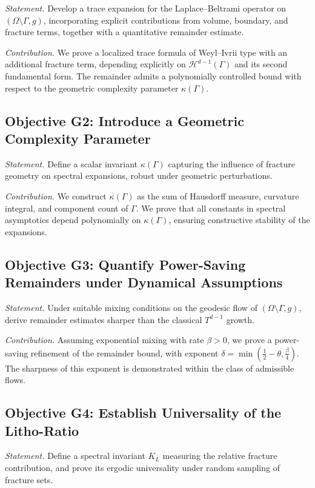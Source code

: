 \emph{Statement.} Develop a trace expansion for the Laplace–Beltrami
operator on $(\Omega \setminus \Gamma,g)$, incorporating explicit
contributions from volume, boundary, and fracture terms, together with a
quantitative remainder estimate.

\emph{Contribution.} We prove a localized trace formula of Weyl–Ivrii
type with an additional fracture term, depending explicitly on
$\mathcal{H}^{d-1}(\Gamma)$ and its second fundamental form. The
remainder admits a polynomially controlled bound with respect to the
geometric complexity parameter $\kappa(\Gamma)$.

\subsection*{Objective G2: Introduce a Geometric Complexity Parameter}

\emph{Statement.} Define a scalar invariant $\kappa(\Gamma)$ capturing
the influence of fracture geometry on spectral expansions, robust under
geometric perturbations.

\emph{Contribution.} We construct $\kappa(\Gamma)$ as the sum of
Hausdorff measure, curvature integral, and component count of $\Gamma$.
We prove that all constants in spectral asymptotics depend polynomially
on $\kappa(\Gamma)$, ensuring constructive stability of the expansions.

\subsection*{Objective G3: Quantify Power-Saving Remainders under Dynamical Assumptions}

\emph{Statement.} Under suitable mixing conditions on the geodesic flow
of $(\Omega \setminus \Gamma,g)$, derive remainder estimates sharper
than the classical $T^{d-1}$ growth.

\emph{Contribution.} Assuming exponential mixing with rate $\beta>0$, we
prove a power-saving refinement of the remainder bound, with exponent
$\delta = \min(\tfrac{1}{2}-\theta, \tfrac{\beta}{4})$. The sharpness of
this exponent is demonstrated within the class of admissible flows.

\subsection*{Objective G4: Establish Universality of the Litho-Ratio}

\emph{Statement.} Define a spectral invariant $K_L$ measuring the
relative fracture contribution, and prove its ergodic universality
under random sampling of fracture sets.

